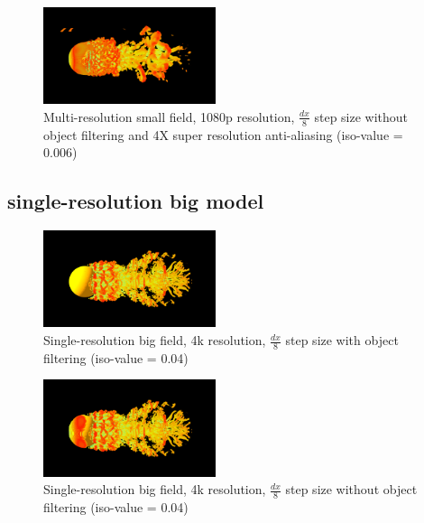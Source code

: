 \documentclass[acmtog]{acmart}
\begin{document}
    \begin{figure}[H]
        \centering
        \includegraphics[width=0.45\textwidth]{./image/multi_small_1080p_8_no_filter_0.006_4XRES}
        \caption{Multi-resolution small field, 1080p resolution, $ \frac{dx}{8} $ step size without object filtering and 4X super resolution anti-aliasing (iso-value = 0.006)}\label{fig:figure8}
    \end{figure}

    \subsection{single-resolution big model}\label{subsec:single-resolution-big-model}
    \begin{figure}[H]
        \centering
        \includegraphics[width=0.45\textwidth]{./image/single_big_4k_8_filter_0.04}
        \caption{Single-resolution big field, 4k resolution, $ \frac{dx}{8} $ step size with object filtering (iso-value = 0.04)}\label{fig:figure9}
    \end{figure}

    \begin{figure}[H]
        \centering
        \includegraphics[width=0.45\textwidth]{./image/single_big_4k_8_no_filter_0.04}
        \caption{Single-resolution big field, 4k resolution, $ \frac{dx}{8} $ step size without object filtering (iso-value = 0.04)}\label{fig:figure10}
    \end{figure}
\end{document}
